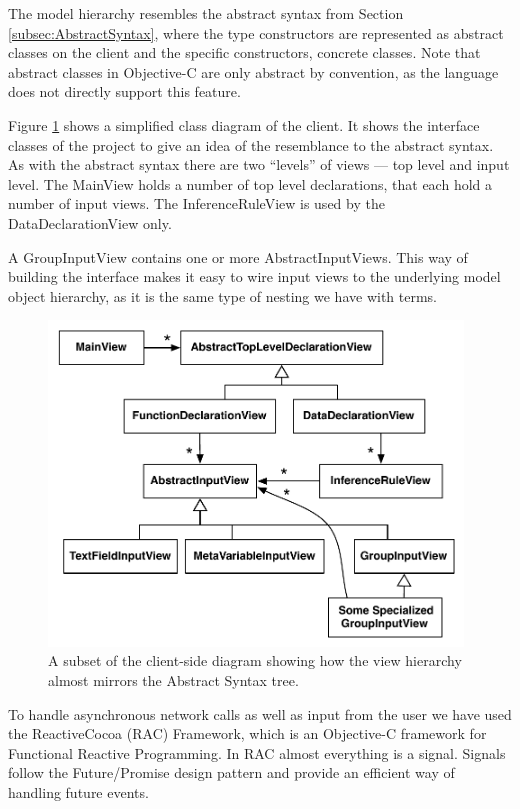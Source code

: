 The model hierarchy resembles the abstract syntax from Section \ref{subsec:AbstractSyntax},
where the type constructors are represented as abstract classes on the client
and the specific constructors, concrete classes. Note that abstract classes in
Objective-C are only abstract by convention, as the language does not directly
support this feature.

Figure \ref{fig:clientViewArchitecture} shows a simplified class diagram of the
client. It shows the interface classes of the project to give an idea of
the resemblance to the abstract syntax. As with the abstract syntax there are
two ``levels'' of views --- top level and input level. The MainView holds a
number of top level declarations, that each hold a number of input views. The
InferenceRuleView is used by the DataDeclarationView only.

A GroupInputView contains one or more AbstractInputViews. This way of building
the interface makes it easy to wire input views to the underlying model object
hierarchy, as it is the same type of nesting we have with terms.

\begin{figure}
	\centering
		\includegraphics[width=110mm]{diagrams/client_side_class_diagram.pdf}
	\caption{A subset of the client-side diagram showing how the view hierarchy
	almost mirrors the Abstract Syntax tree.}
	\label{fig:clientViewArchitecture}
\end{figure}

To handle asynchronous network calls as well as input from the user we have
used the ReactiveCocoa (RAC) Framework, which is an Objective-C framework for
Functional Reactive Programming. In RAC almost everything is a
signal. Signals follow the Future/Promise design pattern and provide an
efficient way of handling future events.












